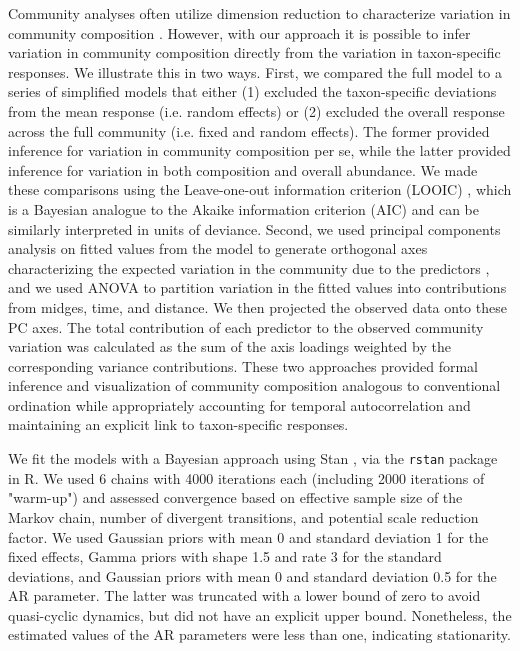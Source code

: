 Community analyses often utilize dimension reduction to characterize 
variation in community composition \citep{Mcgarigal2013}.
However, with our approach it is possible to infer variation in community composition 
directly from the variation in taxon-specific responses.
We illustrate this in two ways.
First, we compared the full model to a series of simplified models that either
(1) excluded the taxon-specific deviations from the mean
response (i.e. random effects) or (2) excluded the overall response across the
full community (i.e. fixed and random effects).
The former provided inference for variation in community composition per se,
while the latter provided inference for variation in both composition and overall abundance.
We made these comparisons using the Leave-one-out information criterion (LOOIC) \citep{Vehtari2017},
which is a Bayesian analogue to the Akaike information criterion (AIC) 
and can be similarly interpreted in units of deviance.
Second, we used principal components analysis on fitted values from the model
to generate orthogonal axes
characterizing the expected variation in the community due to the predictors
\citep[similar to][]{Jackson2012},
and we used ANOVA to partition variation in the fitted values 
into contributions from midges, time, and distance. 
We then projected the observed data onto these PC axes.
The total contribution of each predictor to the observed community variation
was calculated as the sum of the axis loadings weighted by 
the corresponding variance contributions.
These two approaches provided formal inference and visualization of community composition analogous 
to conventional ordination while appropriately accounting 
for temporal autocorrelation and maintaining an explicit link to taxon-specific responses. 



We fit the models with a Bayesian approach using Stan \citep{Carpenter2017},
via the \texttt{rstan} \citep{Stan2018} package in R.
We used 6 chains with 4000 iterations each (including 2000 iterations of "warm-up")
and assessed convergence based on effective sample size of the Markov chain, number of divergent
transitions, and potential scale reduction factor.
We used Gaussian priors with mean 0 and standard deviation 1 for the fixed effects,
Gamma priors with shape 1.5 and rate 3 for the standard deviations,
and Gaussian priors with mean 0 and standard deviation 0.5 for the AR parameter.
The latter was truncated with a lower bound of zero to avoid quasi-cyclic dynamics,
but did not have an explicit upper bound. 
Nonetheless, the estimated values of the AR parameters were less than one, indicating stationarity. 
